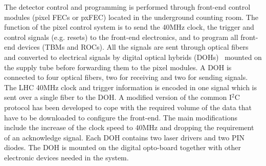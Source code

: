 The detector control and programming is performed through front-end control modules (pixel FECs or pxFEC) located in the underground counting room.
The function of the pixel control system is to send the 40\unit{MHz} clock, the trigger and control signals (e.g. resets) to the front-end electronics,
and to program all front-end devices (TBMs and ROCs).
All the signals are sent through optical fibers and converted to electrical signals by digital optical hybrids (DOHs)~\cite{1221923} mounted on the supply tube before forwarding them to the pixel modules.
A DOH is connected to four optical fibers, two for receiving and two for sending signals. The LHC 40\unit{MHz} clock and trigger information is encoded in one signal which is sent over a single fiber to the DOH. 
A modified version of the common I$^2$C protocol has been developed to cope with the required volume of the data that have to be downloaded to configure the front-end.
The main modifications include the increase of the clock speed to 40\unit{MHz} and dropping the requirement of an acknowledge signal.
Each DOH contains two laser drivers and two PIN diodes. The DOH is mounted on the digital opto-board together with other electronic devices needed in the system.
